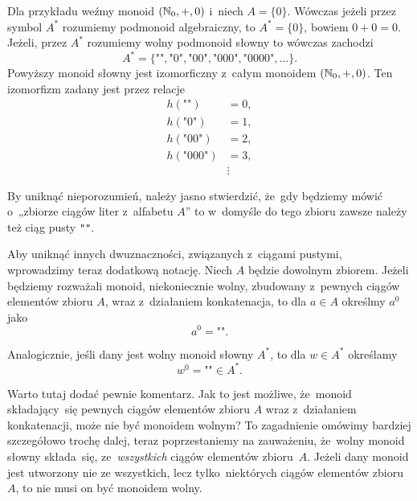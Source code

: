 \documentclass[a4paper,11pt]{article}
\begin{document}
Dla przykładu weźmy monoid $( \mathbb{N}_{ 0 }, +, 0)$ i~niech
$A = \{ 0 \}$. Wówczas jeżeli przez symbol $A^{ * }$ rozumiemy
podmonoid algebraiczny, to $A^{ * } = \{ 0 \}$, bowiem $0 + 0 = 0$.
Jeżeli, przez $A^{ * }$ rozumiemy wolny podmonoid słowny to wówczas
zachodzi
\begin{equation}
  \label{eq:Forys-Forys-12}
  A^{ * } = \{ \texttt{""}, \texttt{"} 0 \texttt{"},
  \texttt{"} 00 \texttt{"}, \texttt{"} 000 \texttt{"},
  \texttt{"} 0000 \texttt{"}, \ldots \}.
\end{equation}
Powyższy monoid słowny jest izomorficzny z~całym monoidem
$( \mathbb{N}_{ 0 }, +, 0)$. Ten izomorfizm zadany jest przez relacje
\begin{equation}
  \label{eq:Forys-Forys-13}
  \begin{split}
    h( \texttt{""} ) &= 0, \\
    h( \texttt{"} 0 \texttt{"} ) &= 1, \\
    h( \texttt{"} 0 0 \texttt{"} ) &= 2, \\
    h( \texttt{"} 0 0 0 \texttt{"} ) &= 3, \\
                     &\vdots
  \end{split}
\end{equation}

\vspace{\spaceFour}





 By uniknąć nieporozumień, należy jasno stwierdzić,
że~gdy będziemy mówić o~„zbiorze ciągów liter z~alfabetu $A$” to
w~domyśle do tego zbioru zawsze należy też ciąg pusty \texttt{""}.

Aby uniknąć innych dwuznaczności, związanych z~ciągami pustymi,
wprowadzimy teraz dodatkową notację. Niech $A$ będzie dowolnym
zbiorem. Jeżeli będziemy rozważali monoid, niekoniecznie wolny,
zbudowany z~pewnych ciągów elementów zbioru $A$, wraz z~działaniem
konkatenacja, to dla $a \in A$ określmy $a^{ 0 }$ jako
\begin{equation}
  \label{eq:Forys-Forys-14}
  a^{ 0 } = \texttt{""}.
\end{equation}

Analogicznie, jeśli dany jest wolny monoid słowny $A^{ * }$, to dla
$w \in A^{ * }$ określamy
\begin{equation}
  \label{eq:Forys-Forys-15}
  w^{ 0 } = \texttt{""} \in A^{ * }.
\end{equation}

Warto tutaj dodać pewnie komentarz. Jak to jest możliwe, że~monoid
składający~się pewnych ciągów elementów zbioru $A$ wraz z~działaniem
konkatenacji, może nie być monoidem wolnym? To zagadnienie omówimy
bardziej szczegółowo trochę dalej, teraz poprzestaniemy na zauważeniu,
że~wolny monoid słowny składa~się, ze~\textit{wszystkich} ciągów
elementów zbioru~$A$. Jeżeli dany monoid jest utworzony nie ze
wszystkich, lecz tylko~niektórych ciągów elementów zbioru~$A$, to nie
musi on być monoidem wolny.
\end{document}
